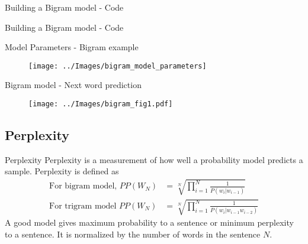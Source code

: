 \begin{frame}{Building a Bigram model - Code}


\end{frame}

\begin{frame}{Building a Bigram model - Code}


\end{frame}

\begin{frame}{Model Parameters - Bigram example}\begin{figure}
	\centering
	\texttt{[image: ../Images/bigram\_model\_parameters]}
	\label{fig:modelparameters}
\end{figure}

\end{frame}

\begin{frame}{Bigram model - Next word prediction}
\begin{figure}
	\centering
	\texttt{[image: ../Images/bigram\_fig1.pdf]}
	\label{fig:bigrammodelgraphforhowphysics}
\end{figure}

\end{frame}




\subsection{Perplexity}
\begin{frame}{Perplexity}
Perplexity is a measurement of how well a probability model predicts a sample.
Perplexity is defined as
\begin{align}
\text{For bigram model, } PP(W_N) &=  \sqrt[N]{{\prod_{i=1}^{N}}\frac{1}{P(w_i|w_{i-1})}}\\
\text{For trigram model } PP(W_N) &=  \sqrt[N]{{\prod_{i=1}^{N}}\frac{1}{P(w_i|w_{i-1}w_{i-2})}}
\end{align}
A good model gives maximum probability to a sentence or  minimum perplexity to a sentence. It is normalized by the number of words in the sentence $N$.
\end{frame}

